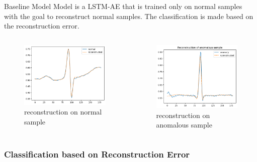 \begin{frame}{Baseline Model}
    Model is a LSTM-AE that is trained only on normal samples with the goal to reconstruct normal samples. The classification is made based on the reconstruction error.
    \begin{columns}
        \begin{column}{0.48\textwidth}
        \begin{figure}
            \centering
            \includegraphics[scale=0.3]{images/rec_normal.png}
            \caption{reconstruction on normal sample \phantom{asdfsadf}}
            \label{fig:enter-label}
        \end{figure}
    \end{column}
    \begin{column}{0.48\textwidth}
        \begin{figure}
            \centering
            \includegraphics[scale=0.3]{images/rec_anom.png}
            \caption{reconstruction on anomalous sample}
            \label{fig:enter-label}
        \end{figure}
    \end{column}
    \end{columns}
\end{frame}

\begin{frame}
    \frametitle{Classification based on Reconstruction Error}

    

\end{frame}